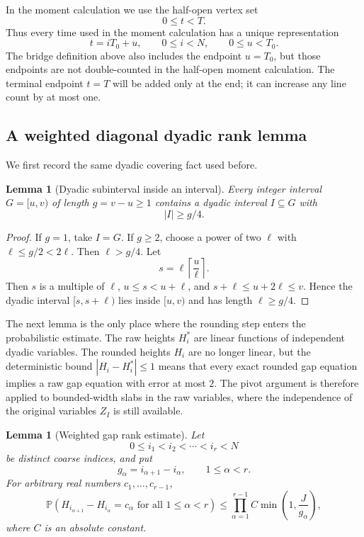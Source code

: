 \documentclass[10pt,a4paper]{amsart}
\newtheorem{lemma}[theorem]{Lemma}
\newcommand{\Pp}{\mathbb P}
\newcommand{\1}{\mathbf 1}
\begin{document}
\bigskip
\noindent
In the moment calculation we use the half-open vertex set
\[
0\le t<T.
\]
Thus every time used in the moment calculation has a unique representation
\[
t=iT_0+u,
\qquad 0\le i<N,
\qquad 0\le u<T_0.
\]
The bridge definition above also includes the endpoint $u=T_0$, but those endpoints are not double-counted in the half-open moment calculation.  The terminal endpoint $t=T$ will be added only at the end; it can increase any line count by at most one.

\subsection{A weighted diagonal dyadic rank lemma}

We first record the same dyadic covering fact used before.

\begin{lemma}[Dyadic subinterval inside an interval]\label{lem:dyadic_subinterval}
Every integer interval $G=[u,v)$ of length $g=v-u\ge1$ contains a dyadic interval $I\subseteq G$ with
\[
|I|\ge g/4.
\]
\end{lemma}

\begin{proof}
If $g=1$, take $I=G$.  If $g\ge2$, choose a power of two $\ell$ with $\ell\le g/2<2\ell$.  Then $\ell>g/4$.  Let
\[
s=\ell\left\lceil\frac{u}{\ell}\right\rceil.
\]
Then $s$ is a multiple of $\ell$, $u\le s<u+\ell$, and $s+\ell\le u+2\ell\le v$.  Hence the dyadic interval $[s,s+\ell)$ lies inside $[u,v)$ and has length $\ell\ge g/4$.
\end{proof}

\smallskip
\noindent
The next lemma is the only place where the rounding step enters the probabilistic estimate.  The raw heights $H_i^*$ are linear functions of independent dyadic variables.  The rounded heights $H_i$ are no longer linear, but the deterministic bound $|H_i-H_i^*|\le1$ means that every exact rounded gap equation implies a raw gap equation with error at most $2$.  The pivot argument is therefore applied to bounded-width slabs in the raw variables, where the independence of the original variables $Z_I$ is still available.

\begin{lemma}[Weighted gap rank estimate]\label{lem:gap_rank}
Let
\[
0\le i_1<i_2<\cdots<i_r<N
\]
be distinct coarse indices, and put
\[
g_\alpha=i_{\alpha+1}-i_\alpha,
\qquad 1\le\alpha<r.
\]
For arbitrary real numbers $c_1,\ldots,c_{r-1}$,
\[
\Pp\left(
H_{i_{\alpha+1}}-H_{i_\alpha}=c_\alpha
\text{ for all }1\le\alpha<r
\right)
\le
\prod_{\alpha=1}^{r-1} C\min\left(1,\frac{J}{g_\alpha}\right),
\]
where $C$ is an absolute constant.
\end{lemma}
\end{document}
